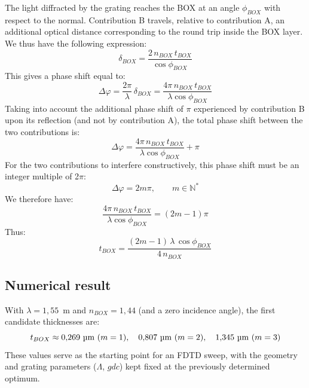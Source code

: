 \documentclass[a4paper,11pt]{report}
\begin{document}
The light diffracted by the grating reaches the BOX at an angle $\phi_{BOX}$ with respect to the normal. Contribution B travels, relative to contribution A, an additional optical distance corresponding to the round trip inside the BOX layer. We thus have the following expression:
\begin{equation}
\delta_{BOX} = \frac{2\,n_{BOX}\,t_{BOX}}{\cos\phi_{BOX}}
\end{equation}
This gives a phase shift equal to:
\begin{equation}
\Delta\varphi = \dfrac{2\pi}{\lambda}\,\delta_{BOX} = \dfrac{4\pi\,n_{BOX}\,t_{BOX}}{\lambda\cos\phi_{BOX}}
\end{equation}
Taking into account the additional phase shift of $\pi$ experienced by contribution B upon its reflection (and not by contribution A), the total phase shift between the two contributions is:
\begin{equation}
\Delta\varphi = \frac{4\pi\,n_{BOX}\,t_{BOX}}{\lambda\cos\phi_{BOX}} + \pi
\end{equation}
For the two contributions to interfere constructively, this phase shift must be an integer multiple of 2$\pi$:
\begin{equation}
\Delta\varphi = 2m\pi, \qquad m\in\mathbb{N}^*
\end{equation}
We therefore have:
\begin{equation}
\frac{4\pi\,n_{BOX}\,t_{BOX}}{\lambda\cos\phi_{BOX}} = (2m-1)\pi
\end{equation}
Thus:
\begin{equation}
\boxed{t_{BOX} = \frac{(2m-1)\,\lambda\,\cos\phi_{BOX}}{4\,n_{BOX}}}
\label{eq:box_quarter_wave}
\end{equation}

\subsection*{Numerical result}

With $\lambda=1{,}55$~\textmu m and $n_{BOX}=1{,}44$ (and a zero incidence angle), the first candidate thicknesses are:
\begin{equation}
t_{BOX}\approx0{,}269~\text{\textmu m}\ (m=1), \quad 0{,}807~\text{\textmu m}\ (m=2), \quad 1{,}345~\text{\textmu m}\ (m=3)
\end{equation}
These values serve as the starting point for an FDTD sweep, with the geometry and grating parameters ($\Lambda$, $gdc$) kept fixed at the previously determined optimum.
\end{document}
